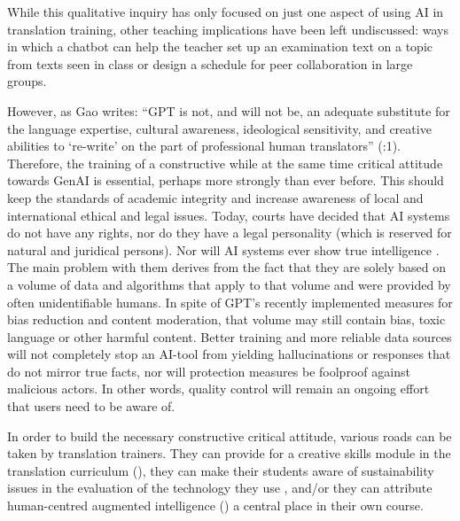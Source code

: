 \documentclass[output=paper]{langscibook}
\begin{document}
While this qualitative inquiry has only focused on just one aspect of using AI in translation training, other teaching implications have been left undiscussed: ways in which a chatbot can help the teacher set up an examination text on a topic from texts seen in class or design a schedule for peer collaboration in large groups. 

However, as Gao writes: “GPT is not, and will not be, an adequate substitute for the language expertise, cultural awareness, ideological sensitivity, and creative abilities to ‘re-write’ on the part of professional human translators” (\citeyear{gao24}:1). Therefore, the training of a constructive while at the same time critical attitude towards GenAI is essential, perhaps more strongly than ever before. This should keep the standards of academic integrity and increase awareness of local and international ethical and legal issues. Today, courts have decided that AI systems do not have any rights, nor do they have a legal personality (which is reserved for natural and juridical persons). Nor will AI systems ever show true intelligence \citep{chomsky23}. The main problem with them derives from the fact that they are solely based on a volume of data and algorithms that apply to that volume and were provided by often unidentifiable humans. In spite of GPT’s recently implemented measures for bias reduction and content moderation, that volume may still contain bias, toxic language or other harmful content. Better training and more reliable data sources will not completely stop an AI-tool from yielding hallucinations or responses that do not mirror true facts, nor will protection measures be foolproof against malicious actors. In other words, quality control will remain an ongoing effort that users need to be aware of. 

In order to build the necessary constructive critical attitude, various roads can be taken by translation trainers. They can provide for a creative skills module in the translation curriculum (\citealt{guerberof2023}), they can make their students aware of sustainability issues in the evaluation of the technology they use \citep{moorkens2024_triple}, and/or they can attribute human-centred augmented intelligence (\citealt{obrien_human-centered_2024}) a central place in their own course.

\sloppy\printbibliography[heading=subbibliography,notkeyword=this]
\end{document}
